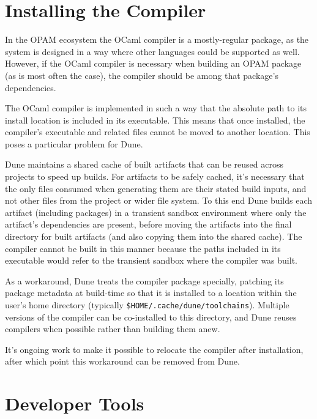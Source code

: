 \documentclass{article}
\begin{document}
\begin{multicols}{2}
        \section {Installing the Compiler}

        In the OPAM ecosystem the OCaml compiler is a mostly-regular package,
        as the system is designed in a way where other languages could be
        supported as well. However, if the OCaml compiler is necessary when
        building an OPAM package (as is most often the case), the compiler should be
        among that package's dependencies.

        The OCaml compiler is implemented in such a way that the absolute path
        to its install location is included in its executable. This means that
        once installed, the compiler's executable and related files cannot be
        moved to another location. This poses a particular problem for Dune.

        Dune maintains a shared cache of built artifacts that can be reused
        across projects to speed up builds. For artifacts to be safely cached,
        it's necessary that the only files consumed when generating them are
        their stated build inputs, and not other files from the project or wider
        file system. To this end Dune builds each artifact (including packages)
        in a transient sandbox environment where only the artifact's
        dependencies are present, before moving the artifacts into the final
        directory for built artifacts (and also copying them into the shared
        cache). The compiler cannot be built in this manner because the paths
        included in its executable would refer to the transient sandbox where
        the compiler was built.

        As a workaround, Dune treats the compiler package specially, patching
        its package metadata at build-time so that it is installed to a location
        within the user's home directory (typically
        \texttt{\$HOME/.cache/dune/toolchains}). Multiple versions of the
        compiler can be co-installed to this directory, and Dune reuses
        compilers when possible rather than building them anew.

        It's ongoing work to make it possible to relocate the compiler after
        installation, after which point this workaround can be removed from
        Dune.

        \section {Developer Tools}


\end{multicols}
\end{document}
